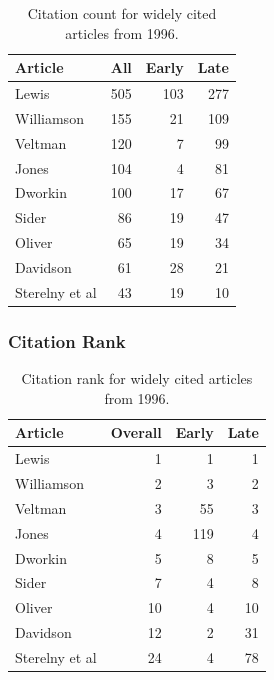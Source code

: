 \documentclass[
  10pt,
  letterpaper,
  DIV=11,
  numbers=noendperiod,
  twoside]{scrartcl}
\begin{document}
\begin{longtable}[]{@{}lrrr@{}}

\caption{\label{tbl-citation-count-1996}Citation count for widely cited
articles from 1996.}

\tabularnewline

\toprule\noalign{}
Article & All & Early & Late \\
\midrule\noalign{}
\endhead
\bottomrule\noalign{}
\endlastfoot
Lewis & 505 & 103 & 277 \\
Williamson & 155 & 21 & 109 \\
Veltman & 120 & 7 & 99 \\
Jones & 104 & 4 & 81 \\
Dworkin & 100 & 17 & 67 \\
Sider & 86 & 19 & 47 \\
Oliver & 65 & 19 & 34 \\
Davidson & 61 & 28 & 21 \\
Sterelny et al & 43 & 19 & 10 \\

\end{longtable}

\subsubsection*{Citation Rank}\label{sec-rank-1996}

\begin{longtable}[]{@{}lrrr@{}}

\caption{\label{tbl-citation-rank-1996}Citation rank for widely cited
articles from 1996.}

\tabularnewline

\toprule\noalign{}
Article & Overall & Early & Late \\
\midrule\noalign{}
\endhead
\bottomrule\noalign{}
\endlastfoot
Lewis & 1 & 1 & 1 \\
Williamson & 2 & 3 & 2 \\
Veltman & 3 & 55 & 3 \\
Jones & 4 & 119 & 4 \\
Dworkin & 5 & 8 & 5 \\
Sider & 7 & 4 & 8 \\
Oliver & 10 & 4 & 10 \\
Davidson & 12 & 2 & 31 \\
Sterelny et al & 24 & 4 & 78 \\

\end{longtable}
\end{document}
